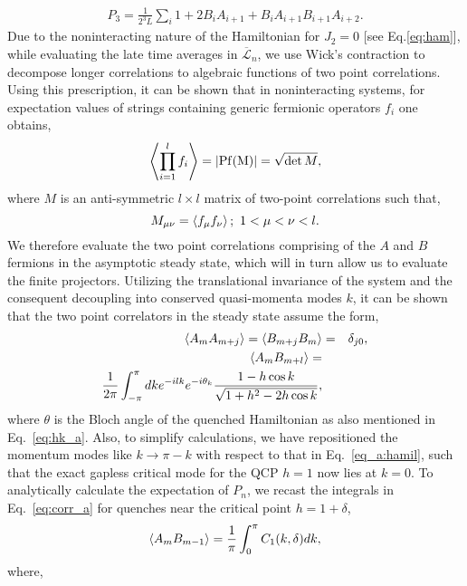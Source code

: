 \documentclass[aps,prx,twocolumn]{revtex4-2}
\begin{document}
{{\begin{equation}
\begin{split}
		P_3=\frac{1}{2^3L}\sum\limits_{i}1+2B_iA_{i+1}+B_iA_{i+1}B_{i+1}A_{i+2}.
	\end{split}
\end{equation}
Due to the noninteracting nature of the Hamiltonian for $J_2=0$ [see Eq.\eqref{eq:ham}], while evaluating the late time averages in $\overline{\mathcal{L}}_n$, we use Wick's contraction to decompose longer correlations to algebraic functions of two point correlations. Using this prescription, it can be shown that in noninteracting systems, for expectation values of strings containing generic fermionic operators $f_{i}$ one obtains,
\begin{equation}\label{eq_a:det}
	\left<\prod_{i=1}^lf_i\right>=\left|\rm{Pf}(M)\right|=\sqrt{\det{M}},
\end{equation}
where $M$ is an anti-symmetric $l\times l$ matrix of two-point correlations such that,
\begin{equation}\label{eq:wick_a}
	M_{\mu\nu}=\braket{f_{\mu}f_{\nu}};~1<\mu<\nu<l.
\end{equation}
We therefore evaluate the two point correlations comprising of the $A$ and $B$ fermions in the asymptotic steady state, which will in turn allow us to evaluate the finite projectors. Utilizing the translational invariance of the system and the consequent decoupling into conserved quasi-momenta modes $k$, it can be shown that the two point correlators in the steady state assume the form,
\begin{eqnarray}\label{eq:corr_a}
	\nonumber\braket{A_mA_{m+j}}=\braket{B_{m+j}B_m}&=&\delta_{j0},\\
	\nonumber \braket{A_mB_{m+l}}=\\
	\frac{1}{2\pi}\int_{-\pi}^{\pi}dke^{-ilk}e^{-i\theta_k}\frac{1-h\cos{k}}{\sqrt{1+h^2-2h\cos{k}}},
\end{eqnarray}
where $\theta$ is the Bloch angle of the quenched Hamiltonian as also mentioned in Eq.~\eqref{eq:hk_a}. Also, to simplify calculations, we have repositioned the momentum modes like $k\rightarrow\pi-k$ with respect to that in Eq.~\eqref{eq_a:hamil}, such that the exact gapless critical mode for the QCP $h=1$ now lies at $k=0$. To analytically calculate the expectation of $P_n$, we recast the integrals in Eq.~\eqref{eq:corr_a} for quenches near the critical point $h=1+\delta$,
\begin{equation}\label{eq:integral_a}
	\braket{A_mB_{m-1}}=\frac{1}{\pi}\int_{0}^{\pi}C_1(k,\delta)dk,
\end{equation}
where,
\begin{equation}

\end{equation}}}
\end{document}
